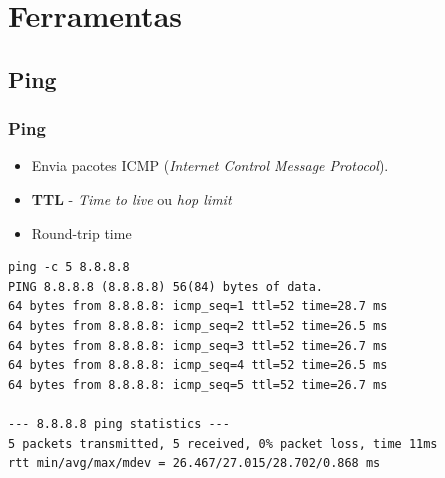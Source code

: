 \documentclass[xcolor=dvipsnames,10pt,compress,aspectratio=169]{beamer}
\begin{document}
\section{Ferramentas}

\subsection{Ping}

\begin{frame}[fragile]
  \frametitle{Ping}
\begin{itemize}
	\item Envia pacotes ICMP (\emph{Internet Control Message Protocol}).
	\item \textbf{TTL} - \emph{Time to live} ou \emph{hop limit}
	\item Round-trip time
\end{itemize}
\begin{verbatim}
ping -c 5 8.8.8.8
PING 8.8.8.8 (8.8.8.8) 56(84) bytes of data.
64 bytes from 8.8.8.8: icmp_seq=1 ttl=52 time=28.7 ms
64 bytes from 8.8.8.8: icmp_seq=2 ttl=52 time=26.5 ms
64 bytes from 8.8.8.8: icmp_seq=3 ttl=52 time=26.7 ms
64 bytes from 8.8.8.8: icmp_seq=4 ttl=52 time=26.5 ms
64 bytes from 8.8.8.8: icmp_seq=5 ttl=52 time=26.7 ms

--- 8.8.8.8 ping statistics ---
5 packets transmitted, 5 received, 0% packet loss, time 11ms
rtt min/avg/max/mdev = 26.467/27.015/28.702/0.868 ms
\end{verbatim}
\end{frame}
\end{document}
